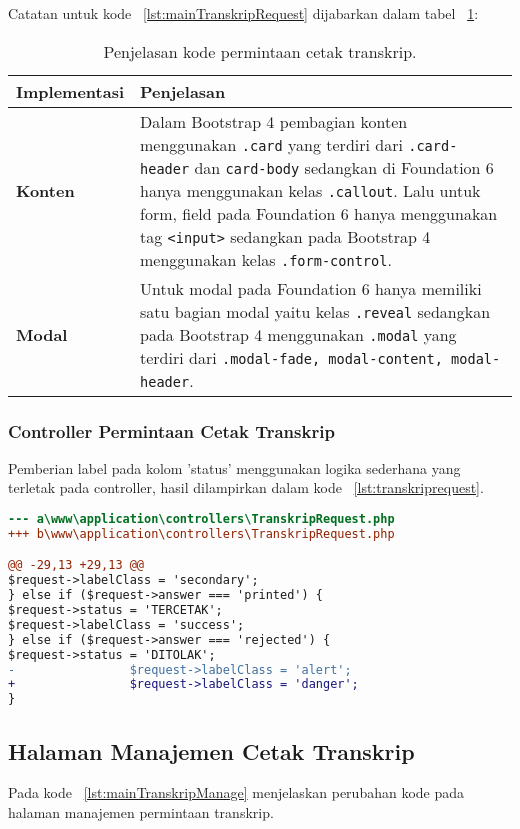 \noindent Catatan untuk kode ~\ref{lst:mainTranskripRequest} dijabarkan dalam tabel ~\ref{table:kodePermintaanCetakTranskrip}:
\begin{table}[H]
	\centering
	\begin{tabularx}{\textwidth}{lX}
		\toprule
		Implementasi     & Penjelasan \\
		\midrule
		\textbf{Konten} & Dalam Bootstrap 4 pembagian konten menggunakan \texttt{.card} yang terdiri dari \texttt{.card-header} dan \texttt{card-body} sedangkan di Foundation 6 hanya menggunakan kelas \texttt{.callout}. Lalu untuk form, field pada Foundation 6 hanya menggunakan tag \texttt{<input>} sedangkan pada Bootstrap 4 menggunakan kelas \texttt{.form-control}.\\
		\textbf{Modal} & Untuk modal pada Foundation 6 hanya memiliki satu bagian modal yaitu kelas \texttt{.reveal} sedangkan pada Bootstrap 4 menggunakan \texttt{.modal} yang terdiri dari \texttt{.modal-fade, modal-content, modal-header}.
		\bottomrule
	\end{tabularx}%
	\caption{Penjelasan kode permintaan cetak transkrip.}
	\label{table:kodePermintaanCetakTranskrip}
\end{table}

\subsubsection{Controller Permintaan Cetak Transkrip}
Pemberian label pada kolom 'status' menggunakan logika sederhana yang terletak pada controller, hasil dilampirkan dalam kode ~\ref{lst:transkriprequest}.
\begin{lstlisting}[language=diff, caption=Perubahan file \www\application\controllers\TranskripRequest.php,  basicstyle=\ttfamily, frame=single,
columns=fullflexible, keepspaces=true, breaklines=true, label={lst:transkriprequest}]
--- a\www\application\controllers\TranskripRequest.php	
+++ b\www\application\controllers\TranskripRequest.php	

@@ -29,13 +29,13 @@
$request->labelClass = 'secondary';
} else if ($request->answer === 'printed') {
$request->status = 'TERCETAK';
$request->labelClass = 'success';
} else if ($request->answer === 'rejected') {
$request->status = 'DITOLAK';
-                $request->labelClass = 'alert';
+                $request->labelClass = 'danger';
}
\end{lstlisting}

\subsection{Halaman Manajemen Cetak Transkrip} 
Pada kode ~\ref{lst:mainTranskripManage} menjelaskan perubahan kode pada halaman manajemen permintaan transkrip.

